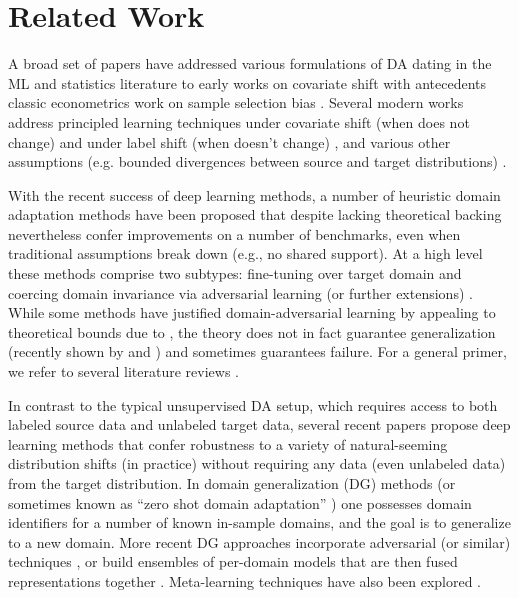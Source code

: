 \documentclass{article}
\begin{document}
 
\section{Related Work}
\label{sec:related}


A broad set of papers have addressed various formulations of DA \citep{bridle1991recnorm,ben2010theory}
dating in the ML and statistics literature 
to early works on covariate shift \citet{shimodaira2000improving}
with antecedents classic econometrics work
on sample selection bias \citep{heckman1977sample,manski1977estimation}. 
Several modern
works address 
principled learning techniques under covariate shift
(when  does not change) \citep{gretton2009covariate}
and under label shift (when  doesn't change) \citep{storkey2009training, zhang2013domain, lipton2018detecting},
and various other assumptions (e.g. bounded divergences between source and target distributions) \citep{mansour2009domain, hu2016robust}.

With the recent success of deep learning methods, 
a number of heuristic domain adaptation methods 
have been proposed that despite lacking theoretical backing
nevertheless confer improvements on a number of benchmarks,
even when traditional assumptions break down (e.g., no shared support).
At a high level these methods comprise two subtypes:
fine-tuning over target domain
\citep{long2016unsupervised,Hoffman_2017,Motiian_2017,Gebru_2017,NIPS2018_7779} 
and coercing domain invariance via adversarial learning (or further extensions) \citep{ganin2016domain,Bousmalis_2017,Tzeng_2017,pmlr-v80-xie18c,pmlr-v80-hoffman18a,NIPS2018_7436,NIPS2018_8075,NIPS2018_8146,NIPS2018_7913,NIPS2018_7380,schoenauer-sebag2018multidomain}. 
While some methods have justified domain-adversarial learning
by appealing to theoretical bounds due to \cite{ben2010theory},
the theory does not in fact guarantee generalization 
(recently shown by \citet{johansson2019support} and  \citet{wu2019domain})
and sometimes guarantees failure.
For a general primer, we refer to several literature reviews \citep{weiss2016survey,csurka2017domain,Wang_2018}. 



In contrast to the typical unsupervised DA setup, 
which requires access to both labeled source data and unlabeled target data,
several recent papers propose deep learning methods 
that confer robustness to a variety of natural-seeming distribution shifts (in practice)
without requiring any data (even unlabeled data) from the target distribution. 
In domain generalization (DG) methods \citep{muandet2013domain} (or sometimes known as ``zero shot domain adaptation'' \citep{kumagai2018zero, niu2015multi,erfani2016robust,li2017domain})  
one possesses domain identifiers for a number of known in-sample domains,
and the goal is to generalize to a new domain.
More recent DG approaches incorporate adversarial (or similar) techniques \citep{ghifary2015domain,wang2016select,motiian2017unified,li2018domain,carlucci2018agnostic}, 
or build ensembles of per-domain models 
that are then fused representations together \citep{bousmalis2016domain,ding2018deep,mancini2018best}. 
Meta-learning techniques have also been explored \citep{li2017learning,NIPS2018_7378}.
\end{document}
